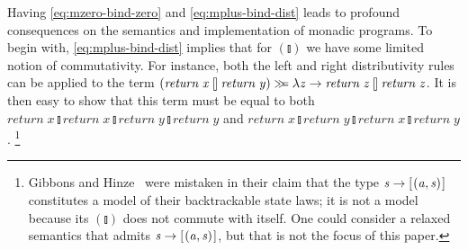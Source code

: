 \documentclass{jfp}
\newcommand{\Varid}[1]{\mathit{#1}}
\let\Varid\mathit
\newcommand{\scm}[1]{\textcolor{teal}{#1}}
\begin{document}
Having \eqref{eq:mzero-bind-zero} and \eqref{eq:mplus-bind-dist} leads to profound consequences on the semantics and implementation of monadic programs.
To begin with, \eqref{eq:mplus-bind-dist} implies that for \ensuremath{(\talloblong)} we have some
limited notion of commutativity.
For instance, both the left and right distributivity rules can be applied to
the term \ensuremath{(\Varid{return}\;\Varid{x}\mathbin{\talloblong}\Varid{return}\;\Varid{y})\mathrel{\hstretch{0.7}{>\!\!>\!\!=}}\lambda \Varid{z}\to \Varid{return}\;\Varid{z}\mathbin{\talloblong}\Varid{return}\;\Varid{z}}.
It is then easy to show that this term must be equal to both
\ensuremath{\Varid{return}\;\Varid{x}\mathbin{\talloblong}\Varid{return}\;\Varid{x}\mathbin{\talloblong}\Varid{return}\;\Varid{y}\mathbin{\talloblong}\Varid{return}\;\Varid{y}} and
\ensuremath{\Varid{return}\;\Varid{x}\mathbin{\talloblong}\Varid{return}\;\Varid{y}\mathbin{\talloblong}\Varid{return}\;\Varid{x}\mathbin{\talloblong}\Varid{return}\;\Varid{y}}.%
\footnote{
  Gibbons and Hinze~\cite{GibbonsHinze:11:Just} were mistaken in their claim
  that the type \ensuremath{\Varid{s}\to [\mskip1.5mu (\Varid{a},\Varid{s})\mskip1.5mu]} constitutes a model of their backtrackable state
  laws; it is not a model because its \ensuremath{(\talloblong)} does not commute with itself.
  One could consider a relaxed semantics that admits \ensuremath{\Varid{s}\to [\mskip1.5mu (\Varid{a},\Varid{s})\mskip1.5mu]}, but that is
  not the focus of this paper.
}

\end{document}
